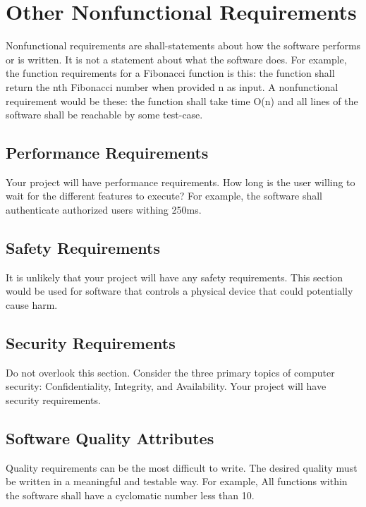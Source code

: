 \section{Other Nonfunctional Requirements}
 Nonfunctional requirements are shall-statements about how the software
 performs or is written.  It is not a statement about what the software does.
 For example, the function requirements for a Fibonacci function is this: the
 function shall return the nth Fibonacci number when provided n as input.  A
 nonfunctional requirement would be these: the function shall take time O(n)
 and all lines of the software shall be reachable by some test-case.


\subsection{Performance Requirements}
 Your project will have performance requirements.  How long is the user willing
 to wait for the different features to execute?   For example, the software
 shall authenticate authorized users withing 250ms.   

\subsection{Safety Requirements}
 It is unlikely that your project will have any safety requirements.  This
 section would be used for software that controls a physical device that could
 potentially cause harm.  

\subsection{Security Requirements}
 Do not overlook this section.  Consider the three primary topics of computer
 security: Confidentiality, Integrity, and Availability.   Your project will
 have security requirements. 


\subsection{Software Quality Attributes}
 Quality requirements can be the most difficult to write.  The desired quality
 must be written in a meaningful and testable way.  For example, All functions
 within the software shall have a cyclomatic number less than 10.  


